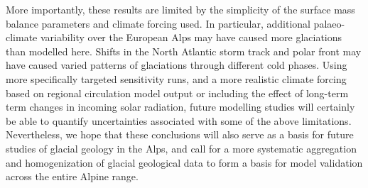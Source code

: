 \documentclass[tc, manuscript]{copernicus}
\begin{document}
    More importantly, these results are limited by the simplicity of the
    surface mass balance parameters and climate forcing used.
    In particular, additional palaeo-climate variability over
    the European Alps may have caused more glaciations than modelled here.
    Shifts in the North Atlantic storm track and polar front may have caused
    varied patterns of glaciations through different cold phases.
    Using more specifically targeted sensitivity runs, and a more realistic
    climate forcing based on regional circulation model output or including
    the effect of long-term term changes in incoming solar radiation, future
    modelling studies will certainly be able to quantify uncertainties
    associated with some of the above limitations. Nevertheless, we hope that
    these conclusions will also serve as a basis for future studies of glacial
    geology in the Alps, and call for a more systematic aggregation and
    homogenization of glacial geological data to form a basis for model
    validation across the entire Alpine range.





\end{document}
